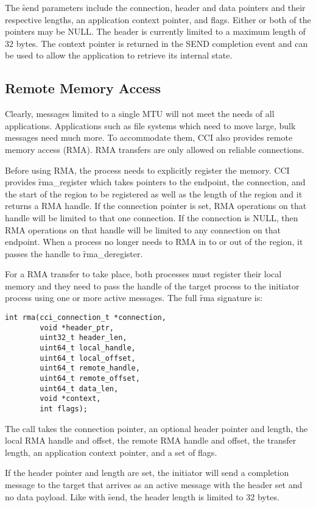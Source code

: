 The \f{send} parameters include the connection, header and data pointers and their
respective lengths, an application context pointer, and flags. Either or both of the
pointers may be NULL. The header is currently limited to a maximum length of 32 bytes. The
context pointer is returned in the SEND completion event and can be used to allow the
application to retrieve its internal state.


\subsection{Remote Memory Access}
Clearly, messages limited to a single MTU will not meet the needs of all applications.
Applications such as file systems which need to move large, bulk messages need much more.
To accommodate them, CCI also provides remote memory access (RMA). RMA transfers are only
allowed on reliable connections.

Before using RMA, the process needs to explicitly register the memory. CCI provides
\f{rma\_register} which takes pointers to the endpoint, the connection, and the start of
the region to be registered as well as the length of the region and it returns a RMA
handle. If the connection pointer is set, RMA operations on that handle will be limited to
that one connection. If the connection is NULL, then RMA operations on that handle will be
limited to any connection on that endpoint.  When a process no longer needs to RMA in to
or out of the region, it passes the handle to \f{rma\_deregister}.

For a RMA transfer to take place, both processes must register their local memory and they
need to pass the handle of the target process to the initiator process using one or more
active messages. The full \f{rma} signature is:

\begin{verbatim}
int rma(cci_connection_t *connection,
        void *header_ptr,
        uint32_t header_len,
        uint64_t local_handle,
        uint64_t local_offset,
        uint64_t remote_handle,
        uint64_t remote_offset,
        uint64_t data_len,
        void *context,
        int flags);
\end{verbatim}

The call takes the connection pointer, an optional header pointer and length, the local
RMA handle and offset, the remote RMA handle and offset, the transfer length, an
application context pointer, and a set of flags.

If the header pointer and length are set, the initiator will send a completion message to
the target that arrives as an active message with the header set and no data payload. Like
with \f{send}, the header length is limited to 32 bytes.

